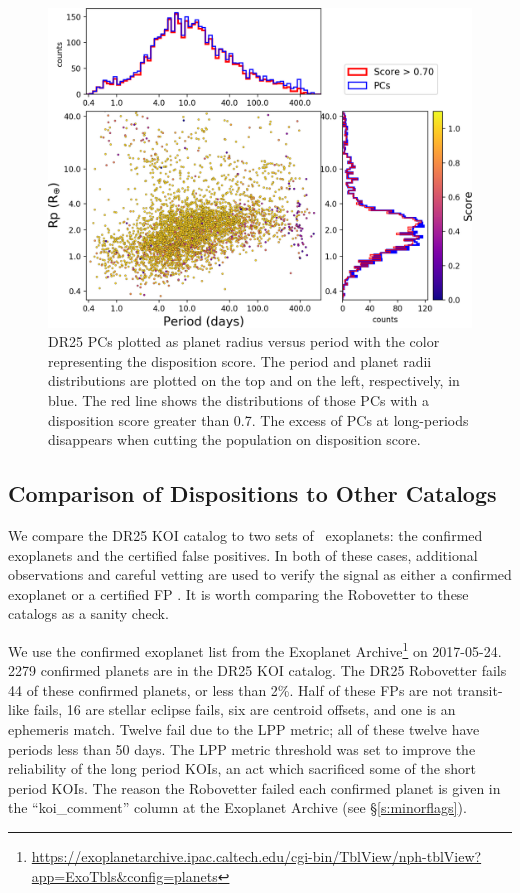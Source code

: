 \begin{figure}[htb]
    \centering
    \includegraphics[width=\linewidth]{fig-radiusPeriodScore-hist-trimmed.png}
    \caption{DR25 PCs plotted as planet radius versus period with the color representing the disposition score. The period and planet radii distributions are plotted on the top and on the left, respectively, in blue. The red line shows the distributions of those PCs with a disposition score greater than 0.7. The excess of PCs at long-periods disappears when cutting the population on disposition score. }
    \label{f:catalogPlot}
\end{figure}

\subsection{Comparison of Dispositions to Other Catalogs}
We compare the DR25 KOI catalog to two sets of \Kepler\ exoplanets: the confirmed exoplanets and the certified false positives.  In both of these cases, additional observations and careful vetting are used to verify the signal as either a confirmed exoplanet or a certified FP \citep{Bryson2017c}. It is worth comparing the Robovetter to these catalogs as a sanity check.  

We use the confirmed exoplanet list from the Exoplanet Archive\footnote{\url{https://exoplanetarchive.ipac.caltech.edu/cgi-bin/TblView/nph-tblView?app=ExoTbls\&config=planets}} on 2017-05-24.  2279 confirmed planets are in the DR25 KOI catalog.  The DR25 Robovetter fails 44 of these confirmed planets, or less than 2\%. Half of these FPs are not transit-like fails, 16 are stellar eclipse fails, six are centroid offsets, and one is an ephemeris match. Twelve fail due to the LPP metric; all of these twelve have periods less than 50 days.  The LPP metric threshold was set to improve the reliability of the long period KOIs, an act which sacrificed some of the short period KOIs.  The reason the Robovetter failed each confirmed planet is given in the ``koi\_comment'' column at the Exoplanet Archive (see \S\ref{s:minorflags}). 

